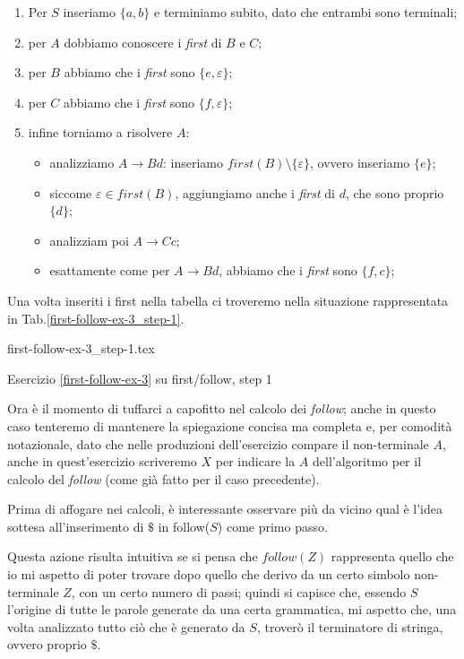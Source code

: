 \documentclass[class=book, crop=false, oneside, 12pt]{standalone}
\begin{document}
\begin{enumerate}
    \item Per \(S\) inseriamo \(\{a, b\}\) e terminiamo subito, dato che entrambi sono terminali;
    \item per \(A\) dobbiamo conoscere i \emph{first} di \(B\) e \(C\);
    \item per \(B\) abbiamo che i \emph{first} sono \(\{e, \varepsilon\}\);
    \item per \(C\) abbiamo che i \emph{first} sono \(\{f, \varepsilon\}\);
    \item infine torniamo a risolvere \(A\):
    \begin{itemize}
        \item analizziamo \(A \to Bd\): inseriamo \(first(B) \setminus \{\varepsilon\}\), ovvero inseriamo \(\{e\}\);
        \item siccome \(\varepsilon \in first(B)\), aggiungiamo anche i \emph{first} di \(d\), che sono proprio \(\{d\}\);
        \item analizziam poi \(A \to Cc\);
        \item esattamente come per \(A \to Bd\), abbiamo che i \emph{first} sono \(\{f, c\}\);
    \end{itemize}
\end{enumerate}
Una volta inseriti i first nella tabella ci troveremo nella situazione rappresentata in Tab.\ref{first-follow-ex-3_step-1}.
\begin{table}[H]
	\centering
	{first-follow-ex-3_step-1.tex}
    \caption{Esercizio \ref{first-follow-ex-3} su first/follow, step 1}
    \label{first-follow-ex-3_step-1}
\end{table}
Ora è il momento di tuffarci a capofitto nel calcolo dei \emph{follow}; anche in questo caso tenteremo di mantenere la spiegazione concisa ma completa e, per comodità notazionale, dato che nelle produzioni dell'esercizio compare il non-terminale \(A\), anche in quest'esercizio scriveremo \(X\) per indicare la \(A\) dell'algoritmo per il calcolo del \emph{follow} (come già fatto per il caso precedente). 

Prima di affogare nei calcoli, è interessante osservare più da vicino qual è l’idea sottesa all'inserimento di \(\$\) in follow(\(S\)) come primo passo.

Questa azione risulta intuitiva se si pensa che \(follow(Z)\) rappresenta quello che io mi aspetto di poter trovare dopo quello che derivo da un certo simbolo non-terminale \(Z\), con un certo numero di passi; quindi si capisce che, essendo \(S\) l’origine di tutte le parole generate da una certa grammatica, mi aspetto che, una volta analizzato tutto ciò che è generato da \(S\), troverò il terminatore di stringa, ovvero proprio \(\$\).
\end{document}
